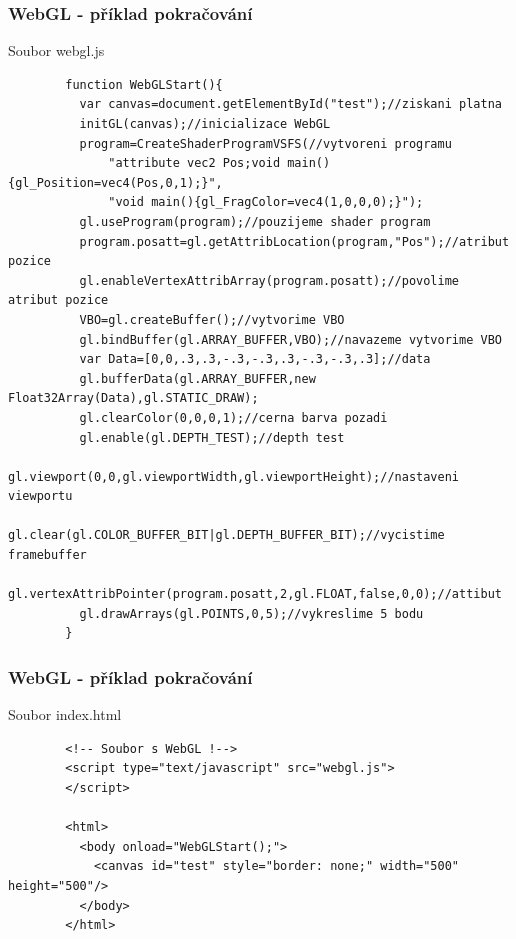 \begin{frame}[fragile]
\frametitle{WebGL - příklad pokračování}
		Soubor webgl.js
		{\scriptsize
		\begin{verbatim}
		function WebGLStart(){
		  var canvas=document.getElementById("test");//ziskani platna
		  initGL(canvas);//inicializace WebGL
		  program=CreateShaderProgramVSFS(//vytvoreni programu
		      "attribute vec2 Pos;void main(){gl_Position=vec4(Pos,0,1);}",
		      "void main(){gl_FragColor=vec4(1,0,0,0);}");
		  gl.useProgram(program);//pouzijeme shader program
		  program.posatt=gl.getAttribLocation(program,"Pos");//atribut pozice
		  gl.enableVertexAttribArray(program.posatt);//povolime atribut pozice
		  VBO=gl.createBuffer();//vytvorime VBO
		  gl.bindBuffer(gl.ARRAY_BUFFER,VBO);//navazeme vytvorime VBO
		  var Data=[0,0,.3,.3,-.3,-.3,.3,-.3,-.3,.3];//data
		  gl.bufferData(gl.ARRAY_BUFFER,new Float32Array(Data),gl.STATIC_DRAW);
		  gl.clearColor(0,0,0,1);//cerna barva pozadi
		  gl.enable(gl.DEPTH_TEST);//depth test
		  gl.viewport(0,0,gl.viewportWidth,gl.viewportHeight);//nastaveni viewportu
		  gl.clear(gl.COLOR_BUFFER_BIT|gl.DEPTH_BUFFER_BIT);//vycistime framebuffer
		  gl.vertexAttribPointer(program.posatt,2,gl.FLOAT,false,0,0);//attibut
		  gl.drawArrays(gl.POINTS,0,5);//vykreslime 5 bodu
		}
		\end{verbatim}
		}
\end{frame}

\begin{frame}[fragile]
\frametitle{WebGL - příklad pokračování}
		Soubor index.html
		{\scriptsize
		\begin{verbatim}
		<!-- Soubor s WebGL !-->
		<script type="text/javascript" src="webgl.js">
		</script>

		<html>
		  <body onload="WebGLStart();">
		    <canvas id="test" style="border: none;" width="500" height="500"/>
		  </body>
		</html>

		\end{verbatim}
		}
\end{frame}

